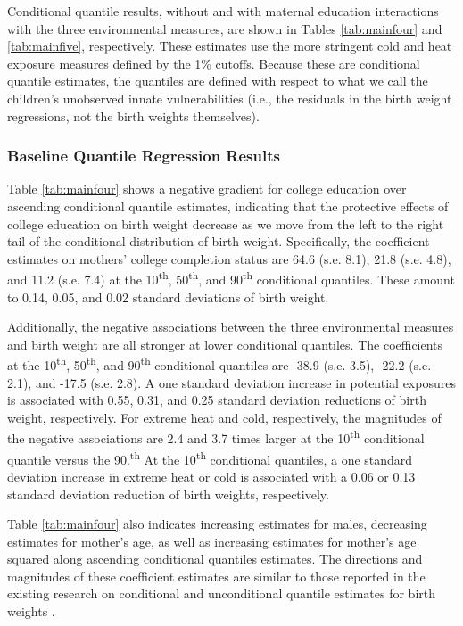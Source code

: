 Conditional quantile results, without and with maternal education
interactions with the three environmental measures,
are shown in Tables \ref{tab:mainfour} and \ref{tab:mainfive}, respectively. These estimates use the more
stringent cold and heat exposure measures defined by the 1\%
cutoffs. Because these are conditional quantile estimates, the quantiles are defined with respect to what we call the children's unobserved innate vulnerabilities (i.e., the residuals in the birth weight regressions, not the birth weights themselves). 

\hypertarget{baseline-quantile-regression-results}{%
\subsubsection{\texorpdfstring{Baseline Quantile Regression Results
}{Baseline Quantile Regression Results }}\label{baseline-quantile-regression-results}}

Table \ref{tab:mainfour} shows a negative gradient for college education over ascending
conditional quantile estimates, indicating that the protective effects of college
education on birth weight decrease as we move from the left to the right tail of the conditional distribution of birth weight. Specifically, the coefficient estimates on mothers'
college completion status are 64.6 (s.e. 8.1), 21.8 (s.e. 4.8), and 11.2
(s.e. 7.4) at the 10\textsuperscript{th}, 50\textsuperscript{th}, and
90\textsuperscript{th} conditional quantiles. These amount to 0.14, 0.05,
and 0.02 standard deviations of birth weight.

Additionally, the negative associations between the three environmental
measures and birth weight are all stronger at lower conditional
quantiles. The \PARPMTEN coefficients at the 10\textsuperscript{th},
50\textsuperscript{th}, and 90\textsuperscript{th} conditional quantiles
are -38.9 (s.e. 3.5), -22.2 (s.e. 2.1), and -17.5 (s.e. 2.8). A one
standard deviation increase in potential \PARPMTEN exposures is associated
with 0.55, 0.31, and 0.25 standard deviation reductions of birth weight,
respectively. For extreme heat and cold, respectively, the magnitudes of the negative associations are
2.4 and 3.7 times larger at the 10\textsuperscript{th} conditional
quantile versus the 90.\textsuperscript{th} At the
10\textsuperscript{th} conditional quantiles, a one standard deviation
increase in extreme heat or cold is associated with a 0.06 or 0.13
standard deviation reduction of birth weights, respectively.

Table \ref{tab:mainfour} also indicates increasing estimates for males, decreasing
estimates for mother's age, as well as increasing estimates for mother's
age squared along ascending conditional quantiles estimates. The
directions and magnitudes of these coefficient estimates are similar to those
reported in the existing research on conditional and 
unconditional quantile estimates for birth weights \autocite{abrevaya_effects_2001, koenker_quantile_2001, firpo_unconditional_2009}.

